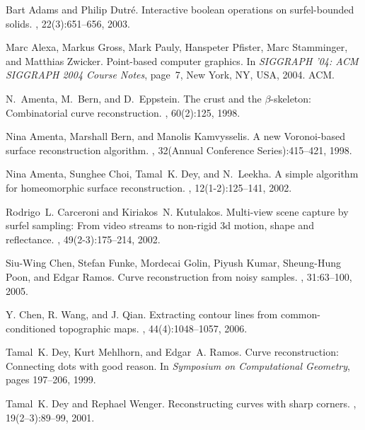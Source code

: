 \documentclass{article}
\numberwithin{cntr}{section}
\numberwithin{equation}{section}
\begin{document}

\begin{thebibliography}{99}

Bart Adams and Philip Dutr\'{e}.
\newblock Interactive boolean operations on surfel-bounded solids.
, 22(3):651--656, 2003.

Marc Alexa, Markus Gross, Mark Pauly, Hanspeter Pfister, Marc Stamminger, and
  Matthias Zwicker.
\newblock Point-based computer graphics.
\newblock In {\em SIGGRAPH '04: ACM SIGGRAPH 2004 Course Notes}, page~7, New
  York, NY, USA, 2004. ACM.

N.~Amenta, M.~Bern, and D.~Eppstein.
\newblock The crust and the $\beta$-skeleton: Combinatorial curve
  reconstruction.
, 60(2):125, 1998.

Nina Amenta, Marshall Bern, and Manolis Kamvysselis.
\newblock A new {Voronoi}-based surface reconstruction algorithm.
, 32({Annual Conference Series}):415--421,
  1998.

Nina Amenta, Sunghee Choi, Tamal~K. Dey, and N.~Leekha.
\newblock A simple algorithm for homeomorphic surface reconstruction.
, 12(1-2):125--141, 2002.

Rodrigo~L. Carceroni and Kiriakos~N. Kutulakos.
\newblock Multi-view scene capture by surfel sampling: From video streams to
  non-rigid 3d motion, shape and reflectance.
, 49(2-3):175--214, 2002.

Siu-Wing Chen, Stefan Funke, Mordecai Golin, Piyush Kumar,
Sheung-Hung Poon, and Edgar Ramos.
\newblock Curve reconstruction from noisy samples.
, 31:63--100, 2005.

Y. Chen, R. Wang, and J. Qian.
\newblock Extracting contour lines from common-conditioned topographic maps.
,
44(4):1048--1057, 2006.

Tamal~K. Dey, Kurt Mehlhorn, and Edgar~A. Ramos.
\newblock Curve reconstruction: Connecting dots with good reason.
\newblock In {\em Symposium on Computational Geometry}, pages 197--206, 1999.

Tamal~K. Dey and Rephael Wenger.
\newblock Reconstructing curves with sharp corners.
, 19(2--3):89--99, 2001.


\end{thebibliography}
\end{document}
